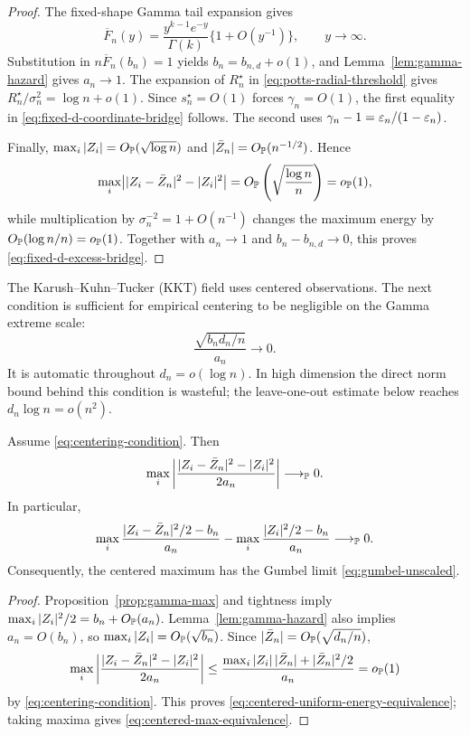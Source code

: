 \begin{proof}
The fixed-shape Gamma tail expansion gives
\[
 \overline F_n(y)=\frac{y^{k-1}e^{-y}}{\Gamma(k)}\{1+O(y^{-1})\},
 \qquad y\to\infty.
\]
Substitution in \(n\overline F_n(b_n)=1\) yields
\(b_n=b_{n,d}+o(1)\), and Lemma~\ref{lem:gamma-hazard} gives
\(a_n\to1\). The expansion of \(R_n^\star\) in
\eqref{eq:potts-radial-threshold} gives
\(R_n^\star/\sigma_n^2=\log n+o(1)\). Since \(s_n^\star=O(1)\) forces
\(\gamma_n=O(1)\), the first equality in
\eqref{eq:fixed-d-coordinate-bridge} follows. The second uses
\(\gamma_n-1=\varepsilon_n/(1-\varepsilon_n)\).

Finally, \(\max_i|Z_i|=O_{\mathbb P}(\sqrt{\log n})\) and
\(|\bar Z_n|=O_{\mathbb P}(n^{-1/2})\). Hence
\[
 \max_i\bigl||Z_i-\bar Z_n|^2-|Z_i|^2\bigr|
 =O_{\mathbb P}\left(\sqrt{\frac{\log n}{n}}\right)=o_{\mathbb P}(1),
\]
while multiplication by \(\sigma_n^{-2}=1+O(n^{-1})\) changes the maximum
energy by \(O_{\mathbb P}(\log n/n)=o_{\mathbb P}(1)\). Together with
\(a_n\to1\) and \(b_n-b_{n,d}\to0\), this proves
\eqref{eq:fixed-d-excess-bridge}.
\end{proof}

The Karush--Kuhn--Tucker (KKT) field uses centered observations. The next
condition is sufficient
for empirical centering to be negligible on the Gamma extreme scale:
\begin{equation}
\label{eq:centering-condition}
  \frac{\sqrt{b_nd_n/n}}{a_n}\longrightarrow0.
\end{equation}
It is automatic throughout \(d_n=o(\log n)\).  In high dimension the direct
norm bound behind this condition is wasteful; the leave-one-out estimate
below reaches \(d_n\log n=o(n^2)\).

\begin{lemma}
\label{lem:centered-radial-max}
Assume \eqref{eq:centering-condition}. Then
\begin{equation}
\label{eq:centered-uniform-energy-equivalence}
  \max_i
  \left|
    \frac{|Z_i-\bar Z_n|^2-|Z_i|^2}{2a_n}
  \right|
  \longrightarrow_{\mathbb P}0.
\end{equation}
In particular,
\begin{equation}
\label{eq:centered-max-equivalence}
  \max_i
  \frac{|Z_i-\bar Z_n|^2/2-b_n}{a_n}
  -
  \max_i
  \frac{|Z_i|^2/2-b_n}{a_n}
  \longrightarrow_{\mathbb P}0.
\end{equation}
Consequently, the centered maximum has the Gumbel limit
\eqref{eq:gumbel-unscaled}.
\end{lemma}

\begin{proof}
Proposition~\ref{prop:gamma-max} and tightness imply
\(\max_i|Z_i|^2/2=b_n+O_{\mathbb P}(a_n)\). Lemma~\ref{lem:gamma-hazard} also
implies \(a_n=O(b_n)\), so \(\max_i|Z_i|=O_{\mathbb P}(\sqrt{b_n})\). Since
\(|\bar Z_n|=O_{\mathbb P}(\sqrt{d_n/n})\),
\[
  \max_i
  \left|
    \frac{|Z_i-\bar Z_n|^2-|Z_i|^2}{2a_n}
  \right|
  \le
  \frac{\max_i|Z_i|\,|\bar Z_n|+|\bar Z_n|^2/2}{a_n}
  =o_{\mathbb P}(1)
\]
by \eqref{eq:centering-condition}. This proves
\eqref{eq:centered-uniform-energy-equivalence}; taking maxima gives
\eqref{eq:centered-max-equivalence}.
\end{proof}

